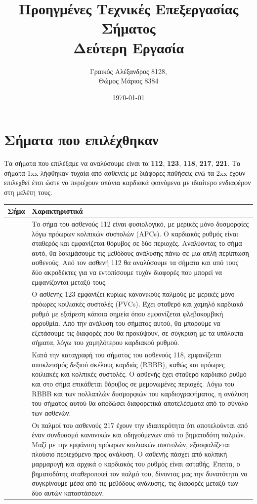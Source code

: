 \documentclass[11pt,a4paper]{article}
\title{Προηγμένες Τεχνικές Επεξεργασίας Σήματος\\Δεύτερη Εργασία}
\author{Γραικός Αλέξανδρος 8128, \\Θώμος Μάριος 8384}
\date{\today}
\begin{document}
\maketitle

\section*{Σήματα που επιλέχθηκαν}
Τα σήματα που επιλέξαμε να αναλύσουμε είναι τα \textbf{112}, \textbf{123}, \textbf{118}, \textbf{217}, \textbf{221}. Τα σήματα 1xx λήφθηκαν τυχαία από ασθενείς με διάφορες παθήσεις ενώ τα 2xx έχουν επιλεχθεί έτσι ώστε να περιέχουν σπάνια καρδιακά φαινόμενα με ιδιαίτερο ενδιαφέρον στη μελέτη τους.

\begin{center}
\begin{tabular}{| >{\centering\arraybackslash}m{1cm} | >{\centering\arraybackslash}m{15cm}|} 
 \hline
 Σήμα & Χαρακτηριστικά \\ 
 \hline 
 112 &  Το σήμα του ασθενούς 112 είναι φυσιολογικό, με μερικές μόνο δυσμορφίες λόγω πρόωρων κολπικών συστολών (APCs). Ο καρδιακός ρυθμός είναι σταθερός και εμφανίζεται θόρυβος σε δύο περιοχές. Αναλύοντας το σήμα αυτό, θα δοκιμάσουμε τις μεθόδους ανάλυσης πάνω σε μια απλή περίπτωση ασθενούς. Από τον ασθενή 112 θα αναλύσουμε τα σήματα και από τους δύο ακροδέκτες για να εντοπίσουμε τυχόν διαφορές που μπορεί να εμφανίζονται μεταξύ τους. \\
 \hline
 123 & Ο ασθενής 123 εμφανίζει κυρίως κανονικούς παλμούς με μερικές μόνο πρόωρες κοιλιακές συστολές (PVCs). Έχει σταθερό και χαμηλό καρδιακό ρυθμό με εξαίρεση κάποια σημεία όπου εμφανίζεται φλεβοκομβική αρρυθμία. Από την ανάλυση του σήματος αυτού, θα μπορούμε να εξετάσουμε τις διαφορές που θα προκύψουν, σε σύγκριση με τα υπόλοιπα σήματα, λόγω του χαμηλότερου καρδιακού ρυθμού. \\
 \hline
 118 & Κατά την καταγραφή του σήματος του ασθενούς 118, εμφανίζεται αποκλεισμός δεξιού σκέλους καρδιάς (RBBB), καθώς και πρόωρες κοιλιακές και κολπικές συστολές. Ο ασθενής έχει σταθερό καρδιακό ρυθμό και στο σήμα επικάθεται θόρυβος σε μεμονωμένες περιοχές. Λόγω του RBBB και των πολλαπλών δυσμορφιών του καρδιογραφήματος, η ανάλυση του σήματος αυτού θα αποδώσει διαφορετικά αποτελέσματα από το σύνολο των ασθενών. \\
 \hline
 217 & Οι παλμοί του ασθενούς 217 έχουν την ιδιαιτερότητα ότι αποτελούνται από έναν συνδυασμό κανονικών και οδηγούμενων από το βηματοδότη παλμών. Μαζί με την εμφάνιση πρόωρων κοιλιακών συστολών, εξασφαλίζεται πλούσιο περιεχόμενο προς ανάλυση. Ο ασθενής πάσχει από κολπική μαρμαρυγή και αρχικά ο καρδιακός του ρυθμός είναι ασταθής. Έπειτα, ο βηματοδότης σταθεροποιεί τον παλμό του, δίνοντας μας την δυνατότητα να συγκρίνουμε μέσα από τις μεθόδους ανάλυσης, τις διαφορές μεταξύ των δύο αυτών καταστάσεων. \\

\end{tabular}
\end{center}
\end{document}
